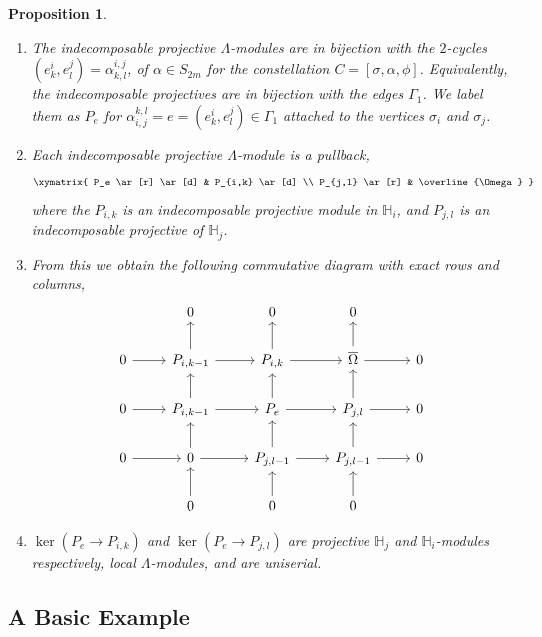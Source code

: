 \documentclass[11pt,oneside]{amsbook}
\numberwithin{equation}{section}
\theoremstyle{plain}
\newtheorem{prop}[theorem]{Proposition}
\theoremstyle{definition}
\theoremstyle{remark}
\newcommand{\HH}{\mathbb{H}}
\begin{document}
	\begin{prop}
		\begin{enumerate}
			\item The indecomposable projective $\Lambda$-modules are in bijection with the $2$-cycles $(e^i_k, e^j_l)=\alpha^{i,j}_{k,l}$, of $\alpha \in S_{2m}$ for the constellation $C=[\sigma, \alpha, \phi]$. Equivalently, the indecomposable projectives are in bijection with the edges $\Gamma_1$. We label them as $P_{e}$ for $\alpha_{i,j}^{k,l} = e = (e^i_k, e^j_l) \in \Gamma_1$ attached to the vertices $\sigma_i$ and $\sigma_j$. 
			\item Each indecomposable projective $\Lambda$-module is a pullback,
			\[
			\xymatrix{
				P_e \ar[r] \ar[d] & P_{i,k} \ar[d] \\
				P_{j,l} \ar[r] & \overline{\Omega}
			}
			\]
			where the $P_{i,k}$ is an indecomposable projective module in $\HH_i$, and $P_{j,l}$ is an indecomposable 
			projective of $\HH_j$.
			\item From this we obtain the following commutative diagram with exact rows and columns,
			\[
			\begin{tikzcd}
				& 0 & 0 & 0 &  \\
				0 \arrow[r] & P_{i,k-1} \arrow[u] \arrow[r] & P_{i,k} \arrow[r] \arrow[u] & \overline{\Omega} \arrow[r] \arrow[u] & 0 \\
				0 \arrow[r] & P_{i,k-1} \arrow[u] \arrow[r] & P_e \arrow[u] \arrow[r] & P_{j,l} \arrow[u] \arrow[r] & 0 \\
				0 \arrow[r] & 0 \arrow[u] \arrow[r] & P_{j,l-1} \arrow[u] \arrow[r] & P_{j,l-1} \arrow[u] \arrow[r] & 0 \\
				& 0 \arrow[u] & 0 \arrow[u] & 0 \arrow[u] & 
			\end{tikzcd}
			\]
			\item $\ker(P_e \to P_{i,k})$ and $\ker(P_e \to P_{j,l})$ are projective $\HH_j$ and $\HH_i$-modules respectively, local $\Lambda$-modules, and are uniserial. 
		\end{enumerate}
	\end{prop}
	
	
	
	
	\subsection{A Basic Example}
	
\end{document}
